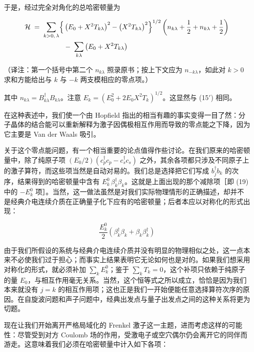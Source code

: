 于是，经过完全对角化的总哈密顿量为

\begin{align*}
\mathcal{H} \;=\; \sum_{k>0,\,\lambda} \Bigl\{ & \left(E_0 + X^{2}T_{k\lambda}\right)^{2} - \left(X^{2}T_{k\lambda}\right)^{2}\Bigr\}^{1/2} \left(n_{k\lambda} + \frac{1}{2} + n_{k\lambda} + \frac{1}{2}\right) \\
& -\;\sum_{k\lambda}\left(E_0 + X^{2}T_{k\lambda}\right)
\end{align*}

（译注：第一个括号中第二个 $n_{k\lambda}$ 照录原书；按上下文应为 $n_{-k\lambda}$，如此对 $k>0$ 求和方能给出与 $k$ 与 $-k$ 两支模相应的零点项。）

其中 $n_{k\lambda} = B_{k\lambda}^{\dagger}B_{k\lambda}$。注意 $E_k = \left(E_0^{2} + 2E_0 X^{2}T_k\right)^{1/2}$。这显然与 (15$'$) 相同。

在这种表述中，我们使一个由 Hopfield 指出的相当有趣的事实变得一目了然：分子晶体的结合能可以重新解释为激子因偶极相互作用而导致的零点能之下降，因为它主要是 Van der Waals 吸引。

关于这个零点能问题，有一个相当重要的论点值得作些讨论。在我们原来的哈密顿量中，除了纯原子项 $(E_0/2)\left(c_p^{\dagger}c_p - c_s^{\dagger}c_s\right)$ 之外，其余各项都只涉及不同原子上的激子算符，而这些项当然是自动对易的。我们总是选择把它们写成 $b_j^{\dagger}b_k$ 的次序，结果得到的哈密顿量中含有 $E_k^{0}\,\beta_k^{\dagger}\beta_k$。这就是上面出现的那个减除项［即 (19) 中的 $-E_k^{0}$ 项］。当然，这一做法虽然是对我们实际物理情形的正确描述，却并不是经典介电连续介质在正确量子化下应有的哈密顿量；后者本应以对称化的形式出现：

\begin{equation*}
\frac{E_k^{0}}{2}\left(\beta_k^{\dagger}\beta_k + \beta_k\beta_k^{\dagger}\right)
\end{equation*}

由于我们所假设的系统与经典介电连续介质并没有明显的物理相似之处，这一点本来不必使我们过于担心；而事实上结果表明它无论如何也是对的。如果我们想采用对称化的形式，就必须补加 $\sum_k E_k^{0}$；鉴于 $\sum_k T_k = 0$，这个补项只依赖于纯原子的量 $E_0$，与相互作用毫无关系。当然，这个恒等式之所以成立，恰恰是因为我们本来就没有 $j=k$ 的相互作用项；这也正是我们一开始便能任意选择算符次序的原因。在自旋波问题和声子问题中，经典出发点与量子出发点之间的这种关系将更为切题。

现在让我们开始离开严格局域化的 Frenkel 激子这一主题，进而考虑这样的可能性：尽管受到对方 Coulomb 场的作用，受激电子或空穴偶尔仍会离开它的同伴而游走。这意味着我们必须在哈密顿量中计入如下各项：

